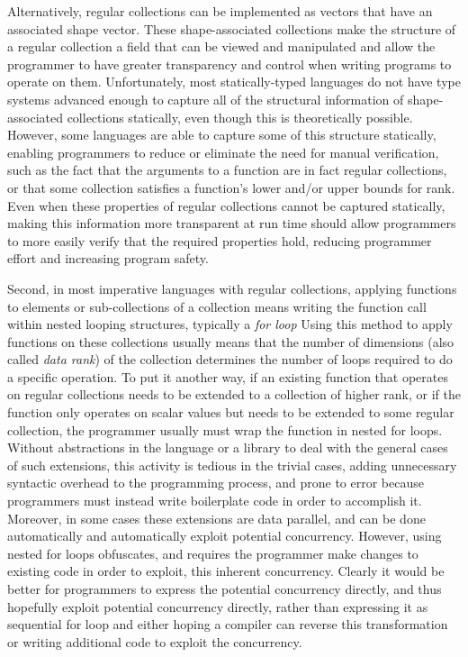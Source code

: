 Alternatively, regular collections can be implemented as vectors that have an associated shape vector. 
These shape-associated collections make the structure of a regular collection 
a field that can be viewed and manipulated and allow the programmer to have 
greater transparency and control when writing programs to operate on them.
Unfortunately, most statically-typed languages do not have type systems advanced enough 
to capture all of the structural information of shape-associated collections statically, 
even though this is theoretically possible. %
However, some languages are able to capture some of this structure statically, 
enabling programmers to reduce or eliminate the need for manual verification, 
such as the fact that the arguments to a function are in fact regular collections,
or that some collection satisfies a function's lower and/or upper bounds for rank\cite{boost}\cite{sac}\cite{dph}.
Even when these properties of regular collections cannot be captured statically, 
making this information more transparent at run time 
should allow programmers to more easily verify that the required properties hold, 
reducing programmer effort and increasing program safety.

Second, in most imperative languages with regular collections, 
applying functions to elements or sub-collections of a collection means 
writing the function call within nested looping structures, typically a \textit{for loop}
Using this method to apply functions on these collections usually means that 
the number of dimensions (also called \textit{data rank}) of the collection 
determines the number of loops required to do a specific operation.
To put it another way, if an existing function that operates on regular collections 
needs to be extended to a collection of higher rank, 
or if the function only operates on scalar values but needs to be extended to some regular collection, 
the programmer usually must wrap the function in nested for loops.
Without abstractions in the language or a library to deal with the general cases of such extensions, 
this activity is tedious in the trivial cases, adding unnecessary syntactic overhead to the programming process,
and prone to error because programmers must instead write boilerplate code in order to accomplish it.
Moreover, in some cases these extensions are data parallel, 
and can be done automatically and automatically exploit potential concurrency.
However, using nested for loops obfuscates,
and requires the programmer make changes to existing code in order to exploit, this inherent concurrency. 
Clearly it would be better for programmers to express the potential concurrency directly, 
and thus hopefully exploit potential concurrency directly, 
rather than expressing it as sequential for loop and either hoping a compiler can reverse this transformation 
or writing additional code to exploit the concurrency.

